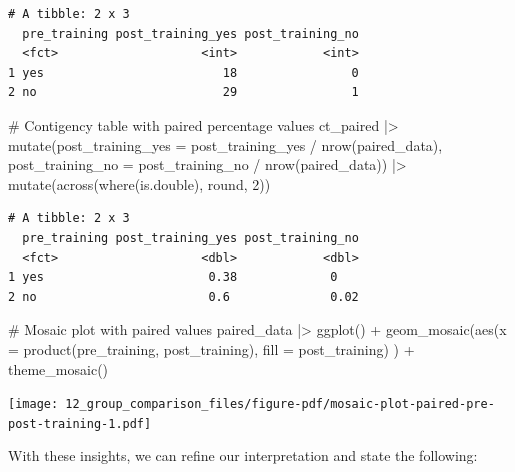 \documentclass[
  letterpaper,
]{krantz}
\makeatletter
\newenvironment{Shaded}{\begin{snugshade}}{\end{snugshade}}
\newcommand{\AttributeTok}[1]{\textcolor[rgb]{0.40,0.45,0.13}{#1}}
\newcommand{\CommentTok}[1]{\textcolor[rgb]{0.37,0.37,0.37}{#1}}
\newcommand{\DecValTok}[1]{\textcolor[rgb]{0.68,0.00,0.00}{#1}}
\newcommand{\FunctionTok}[1]{\textcolor[rgb]{0.28,0.35,0.67}{#1}}
\newcommand{\NormalTok}[1]{\textcolor[rgb]{0.00,0.23,0.31}{#1}}
\newcommand{\SpecialCharTok}[1]{\textcolor[rgb]{0.37,0.37,0.37}{#1}}
\newenvironment{kframe}{%
\medskip{}
\setlength{\fboxsep}{.8em}
 \def\at@end@of@kframe{}%
 \ifinner\ifhmode%
  \def\at@end@of@kframe{\end{minipage}}%
  \begin{minipage}{\columnwidth}%
 \fi\fi%
 \def\FrameCommand##1{\hskip\@totalleftmargin \hskip-\fboxsep
 \colorbox{shadecolor}{##1}\hskip-\fboxsep
     \hskip-\linewidth \hskip-\@totalleftmargin \hskip\columnwidth}%
 \MakeFramed {\advance\hsize-\width
   \@totalleftmargin\z@ \linewidth\hsize
   \@setminipage}}%
 {\par\unskip\endMakeFramed%
 \at@end@of@kframe}
\renewenvironment{Shaded}{\begin{kframe}}{\end{kframe}}
\makeatother
\begin{document}
\begin{verbatim}
# A tibble: 2 x 3
  pre_training post_training_yes post_training_no
  <fct>                    <int>            <int>
1 yes                         18                0
2 no                          29                1
\end{verbatim}

\begin{Shaded}
\begin{Highlighting}[]
\CommentTok{\# Contigency table with paired percentage values}
\NormalTok{ct\_paired }\SpecialCharTok{|\textgreater{}}
  \FunctionTok{mutate}\NormalTok{(}\AttributeTok{post\_training\_yes =}\NormalTok{ post\_training\_yes }\SpecialCharTok{/} \FunctionTok{nrow}\NormalTok{(paired\_data),}
         \AttributeTok{post\_training\_no =}\NormalTok{ post\_training\_no }\SpecialCharTok{/} \FunctionTok{nrow}\NormalTok{(paired\_data)) }\SpecialCharTok{|\textgreater{}}
  \FunctionTok{mutate}\NormalTok{(}\FunctionTok{across}\NormalTok{(}\FunctionTok{where}\NormalTok{(is.double), round, }\DecValTok{2}\NormalTok{))}
\end{Highlighting}
\end{Shaded}

\begin{verbatim}
# A tibble: 2 x 3
  pre_training post_training_yes post_training_no
  <fct>                    <dbl>            <dbl>
1 yes                       0.38             0   
2 no                        0.6              0.02
\end{verbatim}

\begin{Shaded}
\begin{Highlighting}[]
\CommentTok{\# Mosaic plot with paired values}
\NormalTok{paired\_data }\SpecialCharTok{|\textgreater{}}
  \FunctionTok{ggplot}\NormalTok{() }\SpecialCharTok{+}
  \FunctionTok{geom\_mosaic}\NormalTok{(}\FunctionTok{aes}\NormalTok{(}\AttributeTok{x =} \FunctionTok{product}\NormalTok{(pre\_training, post\_training),}
                  \AttributeTok{fill =}\NormalTok{ post\_training)}
\NormalTok{              ) }\SpecialCharTok{+}
  \FunctionTok{theme\_mosaic}\NormalTok{()}
\end{Highlighting}
\end{Shaded}

\texttt{[image: 12\_group\_comparison\_files/figure-pdf/mosaic-plot-paired-pre-post-training-1.pdf]}

With these insights, we can refine our interpretation and state the
following:
\end{document}
